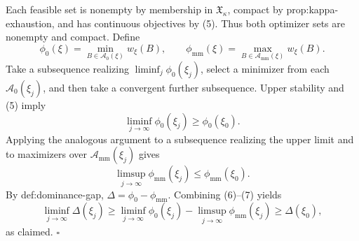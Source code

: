 Each feasible set is nonempty by membership in \(\mathfrak X_\kappa\), compact by prop:kappa-exhaustion, and has continuous objectives by (5).  Thus both optimizer sets are nonempty and compact.  Define
\[
\phi_0(\xi)=\min_{B\in\mathcal A_0(\xi)}w_\xi(B),
\qquad
\phi_{\mathrm{mm}}(\xi)=\max_{B\in\mathcal A_{\mathrm{mm}}(\xi)}w_\xi(B).
\]
Take a subsequence realizing \(\liminf_j\phi_0(\xi_j)\), select a minimizer from each \(\mathcal A_0(\xi_j)\), and then take a convergent further subsequence.  Upper stability and (5) imply
\[
\liminf_{j\to\infty}\phi_0(\xi_j)\ge\phi_0(\xi_0).
\tag{6}
\]
Applying the analogous argument to a subsequence realizing the upper limit and to maximizers over \(\mathcal A_{\mathrm{mm}}(\xi_j)\) gives
\[
\limsup_{j\to\infty}\phi_{\mathrm{mm}}(\xi_j)
\le\phi_{\mathrm{mm}}(\xi_0).
\tag{7}
\]
By def:dominance-gap, \(\Delta=\phi_0-\phi_{\mathrm{mm}}\).  Combining (6)--(7) yields
\[
\liminf_{j\to\infty}\Delta(\xi_j)
\ge
\liminf_{j\to\infty}\phi_0(\xi_j)
-\limsup_{j\to\infty}\phi_{\mathrm{mm}}(\xi_j)
\ge\Delta(\xi_0),
\]
as claimed. \(\square\)